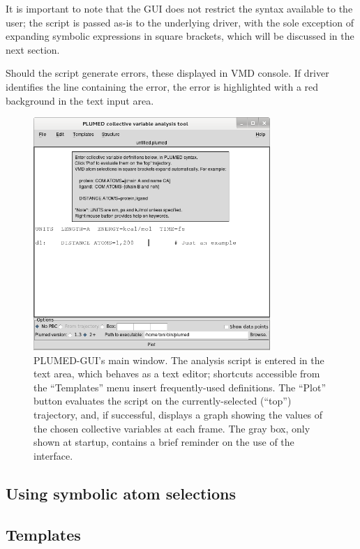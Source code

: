 \documentclass[preprint,12pt]{elsarticle}
\begin{document}
It is important to note that the GUI does not restrict the syntax
available to the user; the script is passed as-is to the underlying
driver, with the sole exception of expanding symbolic expressions in
square brackets, which will be discussed in the next section.

Should the script generate errors, these displayed in VMD console.  If
driver identifies the line containing the error, the error is
highlighted with a red background in the text input area.






\begin{figure}
  \centering
  \includegraphics[width=0.8\textwidth]{images/main}
  \caption{PLUMED-GUI's main window. 
    The analysis script is entered in the text area, which behaves as
    a text editor; shortcuts accessible from the ``Templates'' menu
    insert frequently-used definitions. The ``Plot'' button evaluates
    the script on the currently-selected (``top'') trajectory, and, if
    successful, displays a graph showing the values of the chosen
    collective variables at each frame. The gray box, only shown at
    startup, contains a brief reminder on the use of the interface.  }
  \label{fig:main}
\end{figure}


\subsection{Using symbolic atom selections}


\subsection{Templates}
\end{document}
